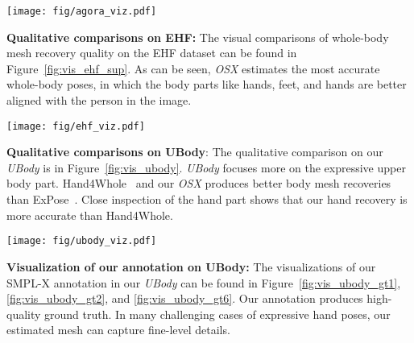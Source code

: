 \documentclass[10pt,twocolumn,letterpaper]{article}
\newcommand{\modelname}{\emph{OSX}\xspace}
\newcommand{\dataname}{\emph{UBody}\xspace}
\begin{document}
\begin{figure*}[h]
\begin{center}
\texttt{[image: fig/agora\_viz.pdf]}
\end{center}
\vspace{-0.6cm}
\caption{
Comparisons of existing 3D whole-body estimation methods on AGORA.
}
\label{fig:vis_agora}
\end{figure*}


\noindent\textbf{Qualitative comparisons on EHF:} 
The visual comparisons of whole-body mesh recovery quality on the EHF dataset can be found in Figure~\ref{fig:vis_ehf_sup}. As can be seen, \modelname estimates the most accurate whole-body poses, in which the body parts like hands, feet, and hands are better aligned with the person in the image. 

\begin{figure*}[h]
\begin{center}
\texttt{[image: fig/ehf\_viz.pdf]}
\end{center}
\vspace{-0.6cm}
\caption{
Comparisons of existing 3D whole-body estimation methods on EHF.
}
\label{fig:vis_ehf_sup}
\end{figure*}

\noindent\textbf{Qualitative comparisons on UBody}: 
The qualitative comparison on our \dataname is in Figure~\ref{fig:vis_ubody}. \dataname focuses more on the expressive upper body part. Hand4Whole~\cite{GyeongsikMoon2020hand4whole} and our \modelname produces better body mesh recoveries than ExPose~\cite{YufeiXu2022ViTPoseSV}. Close inspection of the hand part shows that our hand recovery is more accurate than Hand4Whole. 

\begin{figure*}[h]
\begin{center}
\texttt{[image: fig/ubody\_viz.pdf]}
\end{center}
\vspace{-0.6cm}
\caption{
Comparisons of existing 3D whole-body estimation methods on our proposed \dataname.
}
\label{fig:vis_ubody}
\end{figure*}


\noindent\textbf{Visualization of our annotation on UBody:} 
The visualizations of our SMPL-X annotation in our \dataname can be found in Figure~\ref{fig:vis_ubody_gt1}, \ref{fig:vis_ubody_gt2}, and \ref{fig:vis_ubody_gt6}. Our annotation produces high-quality ground truth. In many challenging cases of expressive hand poses, our estimated mesh can capture fine-level details.  
\end{document}
